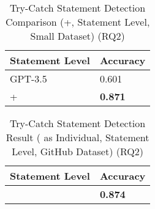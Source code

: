 
\begin{table}[t]%
  \caption{Try-Catch Statement Detection Comparison ({\xblock}+{\xstate}, Statement Level, Small Dataset) (RQ2)}
  \vspace{-12pt}
  \small
	\begin{center}
		\renewcommand{\arraystretch}{1}
		\begin{tabular}{| p{3.05cm}<{\centering} | p{1.2cm}<{\centering}|}
		  \hline
		Statement Level	  & Accuracy \\
			\hline
                        GPT-3.5 & 0.601  \\
			\hline
			\xblock + \xstate   & \textbf{0.871} \\
			\hline
		\end{tabular}
		\label{tab:xstate-3}
	\end{center}
\end{table}

\begin{table}[t]%
\caption{Try-Catch Statement Detection Result ({\xstate} as Individual, Statement Level, GitHub Dataset) (RQ2)}
  \vspace{-12pt}
  \small
	\begin{center}
		\renewcommand{\arraystretch}{1}
		\begin{tabular}{| p{3.05cm}<{\centering} | p{1.2cm}<{\centering}|}
		  \hline
		Statement Level	  & Accuracy\\
			\hline
			\xstate  & \textbf{0.874}  \\
			\hline
		\end{tabular}
		\label{tab:xstate-4}
	\end{center}
\end{table}

